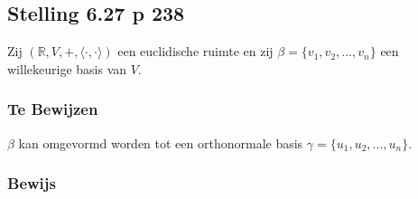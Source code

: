\documentclass[lineaire_algebra_oplossingen.tex]{subfiles}
\begin{document}
\subsection{Stelling 6.27 p 238}
Zij $(\mathbb{R}, V,+, \langle \cdot,\cdot \rangle)$ een euclidische ruimte en zij $\beta = \{v_1,v_2,...,v_n\}$ een willekeurige basis van $V$.

\subsubsection*{Te Bewijzen}
$\beta$ kan omgevormd worden tot een orthonormale basis $\gamma = \{u_1,u_2,...,u_n\}$.

\subsubsection*{Bewijs}
\end{document}
